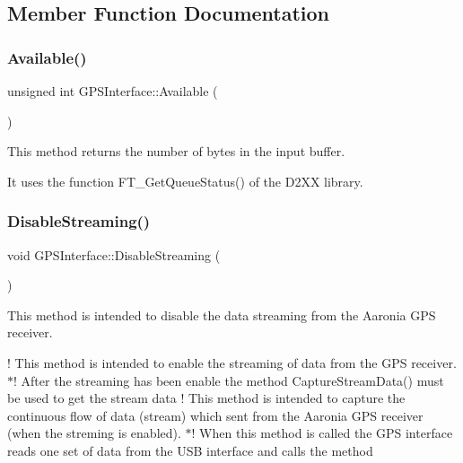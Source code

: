 \subsection{Member Function Documentation}
\mbox{\label{classGPSInterface_a3f92ed959a1ea60258e48ca7c379aec1}} 
\subsubsection{\texorpdfstring{Available()}{Available()}}
{\footnotesize\ttfamily unsigned int G\+P\+S\+Interface\+::\+Available (\begin{DoxyParamCaption}{ }\end{DoxyParamCaption})}



This method returns the number of bytes in the input buffer. 

It uses the function F\+T\+\_\+\+Get\+Queue\+Status() of the D2\+XX library. \mbox{\label{classGPSInterface_a663c36374cc097040cb8945a3c25b190}} 
\subsubsection{\texorpdfstring{Disable\+Streaming()}{DisableStreaming()}}
{\footnotesize\ttfamily void G\+P\+S\+Interface\+::\+Disable\+Streaming (\begin{DoxyParamCaption}{ }\end{DoxyParamCaption})}



This method is intended to disable the data streaming from the Aaronia G\+PS receiver. 

! This method is intended to enable the streaming of data from the G\+PS receiver. $\ast$! After the streaming has been enable the method Capture\+Stream\+Data() must be used to get the stream data ! This method is intended to capture the continuous flow of data (stream) which sent from the Aaronia G\+PS receiver (when the streming is enabled). $\ast$! When this method is called the G\+PS interface reads one set of data from the U\+SB interface and calls the method \mbox{\label{classGPSInterface_ac4a2712c98235f5ca2d826525180840b}} 
